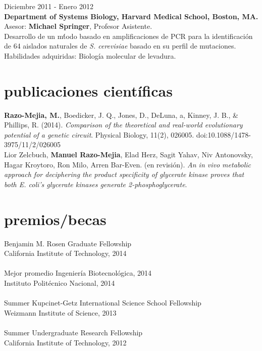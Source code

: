 \documentclass[]{friggeri-cv}
\begin{document}
{\small{}Diciembre 2011 - Enero 2012}\\
\textbf{Department of Systems Biology, Harvard Medical School, Boston, MA.}\\
Asesor: \textbf{Michael Springer}, Profesor Asistente.\\
Desarrollo de un m\'todo basado en amplificaciones de PCR para la identificaci\'on de 64 aislados naturales de \textit{S. cerevisiae} basado en su perfil de mutaciones.\\
{\small{}Habilidades adquiridas: Biolog\'ia molecular de levadura.}\\

\section{publicaciones cient\'ificas}
\textbf{Razo-Mejia, M.}, Boedicker, J. Q., Jones, D., DeLuna, a, Kinney, J. B., & Phillips, R. (2014). \textit{Comparison of the theoretical and real-world evolutionary potential of a genetic circuit}. Physical Biology, 11(2), 026005. doi:10.1088/1478-3975/11/2/026005\\

Lior Zelcbuch, \textbf{Manuel Razo-Mejia}, Elad Herz, Sagit Yahav, Niv Antonovsky, Hagar Kroytoro, Ron Milo, Arren Bar-Even. (en revisi\'on). \textit{An in vivo metabolic approach for deciphering the product specificity of glycerate kinase proves that both E. coli's glycerate kinases generate 2-phosphoglycerate}.


\section{premios/becas}
Benjamin M. Rosen Graduate Fellowship\\
{California Institute of Technology, 2014}\\
\\
Mejor promedio Ingenier\'ia Biotecnol\'ogica,  2014\\
{Instituto Polit\'ecnico Nacional, 2014}\\
\\
Summer Kupcinet-Getz International Science School Fellowship\\
{Weizmann Institute of Science, 2013}\\
\\
Summer Undergraduate Research Fellowship\\
{California Institute of Technology, 2012}\\
\end{document}
